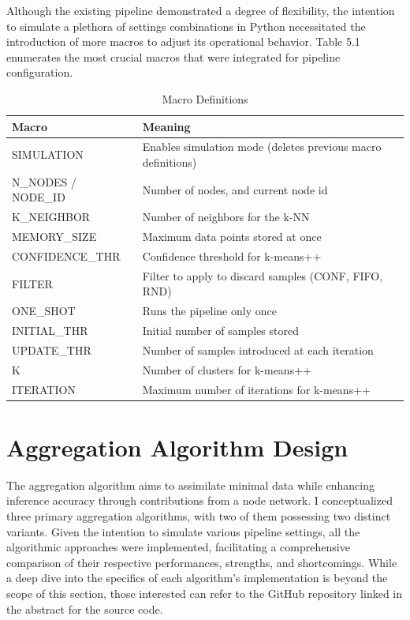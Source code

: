 Although the existing pipeline demonstrated a degree of flexibility, the intention to simulate a plethora of settings combinations in Python necessitated the introduction of more macros to adjust its operational behavior. Table 5.1 enumerates the most crucial macros that were integrated for pipeline configuration.

\begin{table}[]
\centering
\caption{Macro Definitions}
\begin{tabularx}{\textwidth}{lX}
\toprule
\textbf{Macro}          & \textbf{Meaning} \\
\midrule
SIMULATION              & Enables simulation mode (deletes previous macro definitions) \\
N\_NODES / NODE\_ID     & Number of nodes, and current node id \\
K\_NEIGHBOR             & Number of neighbors for the k-NN \\
MEMORY\_SIZE            & Maximum data points stored at once \\
CONFIDENCE\_THR         & Confidence threshold for k-means++ \\
FILTER                  & Filter to apply to discard samples (CONF, FIFO, RND) \\
ONE\_SHOT               & Runs the pipeline only once \\
INITIAL\_THR            & Initial number of samples stored \\
UPDATE\_THR             & Number of samples introduced at each iteration \\
K                       & Number of clusters for k-means++ \\
ITERATION               & Maximum number of iterations for k-means++ \\
\bottomrule
\end{tabularx}
\end{table}


\section{Aggregation Algorithm Design}
\label{sec:aggregation_algorithm}
The aggregation algorithm aims to assimilate minimal data while enhancing inference accuracy through contributions from a node network. I conceptualized three primary aggregation algorithms, with two of them possessing two distinct variants. Given the intention to simulate various pipeline settings, all the algorithmic approaches were implemented, facilitating a comprehensive comparison of their respective performances, strengths, and shortcomings. While a deep dive into the specifics of each algorithm's implementation is beyond the scope of this section, those interested can refer to the GitHub repository linked in the abstract for the source code.

